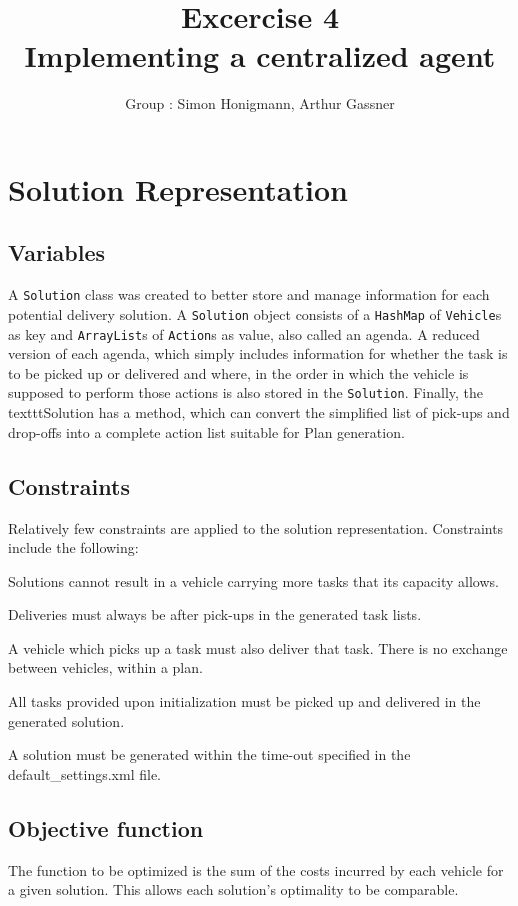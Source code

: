 \documentclass[11pt]{article}
\title{\bf Excercise 4\\ Implementing a centralized agent}
\author{Group \textnumero76: Simon Honigmann, Arthur Gassner}
\begin{document}
\maketitle
\section{Solution Representation}
\subsection{Variables}
A \texttt{Solution} class was created to better store and manage information for each potential delivery solution. A \texttt{Solution} object consists of a \texttt{HashMap} of \texttt{Vehicle}s as key and \texttt{ArrayList}s of \texttt{Action}s as value, also called an agenda. A reduced version of each agenda, which simply includes information for whether the task is to be picked up or delivered and where, in the order in which the vehicle is supposed to perform those actions is also stored in the \texttt{Solution}. Finally, the texttt{Solution} has a method, which can convert the simplified list of pick-ups and drop-offs into a complete action list suitable for Plan generation.

\subsection{Constraints}
Relatively few constraints are applied to the solution representation. Constraints include the following:

\begin{compactenum}
	\item Solutions cannot result in a vehicle carrying more tasks that its capacity allows.
	\item Deliveries must always be after pick-ups in the generated task lists.
	\item A vehicle which picks up a task must also deliver that task. There is no exchange between vehicles, within a plan.
	\item All tasks provided upon initialization must be picked up and delivered in the generated solution.
	\item A solution must be generated within the time-out specified in the default\_settings.xml file. 
\end{compactenum}

\subsection{Objective function}
The function to be optimized is the sum of the costs incurred by each vehicle for a given solution. This allows each solution's optimality to be comparable.
\end{document}
